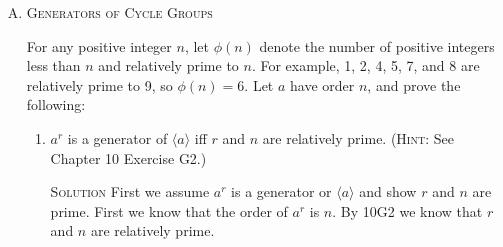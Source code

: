 \documentclass[twoside]{amsart}
\newcommand{\solution}{\textsc{Solution}\xspace}
\newcommand{\blank}{\vspace{5pt}}
\newcommand{\ind}{\hspace{.35in}}
\newcommand{\itm}{\blank\item}
\newcommand{\sol}{\blank\noindent\solution}
\begin{document}
\begin{enumerate}[A.]
\begin{enumerate}[1)]
      \sol Need to show that $f$ is injective and surjective.

      \ind INJECTIVE: Let $f(a^i)=f(a^j)$ where $0 \leq i,j <
      n$. Because $f(x) = x^m$, we have $a^{im} = a^{jm}$. From this
      we know that $im \bmod n = jm \bmod n = r$. Therefore, $nq_i + r
      = im$ and $nq_j + r = jm$. Solving each for $r$: $r = im - nq_i
      = jm - nq_j$. So $im = jm + nq_i - nq_j = jm + n(q_i -
      q_j)$. Therfore $i = j + n/m(q_i - q_j)$. Now $n$ and $m$ are
      relatively prime so $n/m$ is a fraction that cannot be
      reduced. So the only way to get an integer value of $i$ is if
      $q_i - q_j$ is a multiple of $m$ say $vm$ for some integer value
      of $v$. So $i = j + nv$. And we can readily see that $j + nv
      \bmod{n} = j$. Therefore $i = j$ and $a^i = a^j$. Therefore, the
      function $f(x) = x ^m$ is injective.

      \ind SURJECTIVE: Let $y = a^i$ be some value in $G$. We must
      find some value of $x = a^j$ where $0 \leq j < n$ such that
      $f(x) = f(a^j) = (a^j)^m = a^i$. So we need $jm \bmod{n} =
      i$. In other words $nq + i = jm$ for some integer value of
      $q$. We choose $j = (nq + i)/m$. This sets up the inequality
      $0 \leq (nq + i)/m < n$. We just choose the right value of $q$
      to make the inequality true and the resulting value is the value
      of $j$. We need to show that there is some value of $q$ that
      makes it true.

      \begin{align*}
        0 &\leq \frac{nq + i}{m} \\
        0 &\leq nq + i \\
        -i &\leq nq \\
        -i/n &\leq q
      \end{align*}


      
   \end{enumerate}

   \itm \textsc{Generators of Cycle Groups}

   \noindent For any positive integer $n$, let $\phi(n)$ denote the
   number of positive integers less than $n$ and relatively prime to
   $n$. For example, 1, 2, 4, 5, 7, and 8 are relatively prime to 9,
   so $\phi(n) = 6$. Let $a$ have order $n$, and prove the following:

   \begin{enumerate}
     \item $a^r$ is a generator of $\langle a \rangle$ iff $r$ and $n$
       are relatively prime. (\textsc{Hint}: See Chapter 10 Exercise
       G2.)

       \sol First we assume $a^r$ is a generator or $\langle a
       \rangle$ and show $r$ and $n$ are prime. First we know that the
       order of $a^r$ is $n$. By 10G2 we know that $r$ and $n$ are
       relatively prime.
   \end{enumerate}

\end{enumerate}
\end{document}

